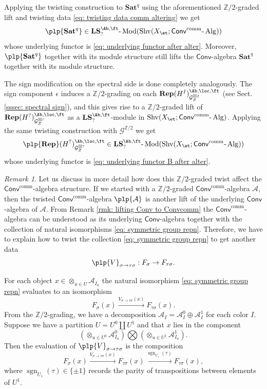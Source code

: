 \documentclass[10pt]{amsart}
\theoremstyle{remark}
\newtheorem{rmk}[subsubsection]{Remark}
\newcommand{\Z}{\mathbb{Z}}
\newcommand{\on}{\operatorname}
\newcommand{\cA}{\mathcal{A}}
\newcommand{\cG}{\mathcal{G}}
\newcommand{\lMod}{\text{-}\on{Mod}}
\newcommand{\lAlg}{\text{-}\on{Alg}}
\newcommand{\Shv}{\on{Shv}}
\newcommand{\Conv}{\mathsf{Conv}}
\newcommand{\Convcomm}{\mathsf{Conv}^{\on{comm}}}
\begin{document}
    Applying the twisting construction to $\mathbf{Sat}^q$ using the aforementioned $\Z/2$-graded lift and twisting data \eqref{eq: twisting data comm altering} we get 
    \[\plp{\mathbf{Sat}^q} \in\mathbf{LS}^{\Ab,\ft}_?\lMod(\Shv(X_{\et};\Convcomm\lAlg))\] whose underlying functor is \eqref{eq: underlying functor after alter}. Moreover, $\plp{\mathbf{Sat}^q}$ together with its module structure still lifts the $\Conv$-algebra $\mathbf{Sat}^q$ together with its module structure.
\medskip

    The sign modification on the spectral side is done completely analogously. The sign component $\epsilon$ induces a $\Z/2$-grading on each $\textbf{Rep}(H^I)^{\Ab,\loc,\ft}_{\cG^{\boxtimes I}_Z}$ (see Sect. \ref{sssec: spectral sign}), and this gives rise to a $\Z/2$-graded lift of $\textbf{Rep}(H^?)^{\Ab,\loc,\ft}_{\cG^{\boxtimes ?}_Z}$ as a $\mathbf{LS}^{\Ab,\ft}_?$-module in $\Shv(X_{\et};\Convcomm\lAlg)$. Applying the same twisting construction with $\cG^{\Z/2}$ we get
    \[\plp{\textbf{Rep}}(H^?)^{\Ab,\loc,\ft}_{\cG^{\boxtimes ?}_Z} \in \mathbf{LS}^{\Ab,\ft}_?\lMod(\Shv(X_{\et};\Convcomm\lAlg))\]
    whose underlying functor is \eqref{eq: underlying functor B after alter}.

    \begin{rmk}\label{rmk: twist by sign}
        Let us discuss in more detail how does this $\Z/2$-graded twist affect the $\Convcomm$-algebra structure. If we started with a $\Z/2$-graded $\Convcomm$-algebra $\cA$, then the twisted $\Convcomm$-algebra $\plp{\cA}$ is another lift of the underlying $\Conv$-algebra of $\cA$. From Remark \ref{rmk: lifting Conv to Convcomm} the $\Convcomm$-algebra can be understood as its underlying $\Conv$-algebra together with the collection of natural isomorphisms \eqref{eq: symmetric group repn}. Therefore, we have to explain how to twist the collection \eqref{eq: symmetric group repn} to get another data
        \[\plp{V}_{\sigma\rightarrow\tau\sigma}:F_{\sigma}\rightarrow F_{\tau\sigma}.\]
        
        For each object
        $x\in \otimes_{u\in U}\cA_{I_u}$ the natural isomorphism \eqref{eq: symmetric group repn} evaluates to an isomorphism \[F_{\sigma}(x)\xrightarrow{V_{\sigma\rightarrow\tau\sigma}(x)} F_{\tau\sigma}(x).\]
        From the $\Z/2$-grading, we have a decomposition $\cA_I=\cA^0_I\oplus \cA^1_I$ for each color $I$. Suppose we have a partition $U=U^0\coprod U^1$ and that $x$ lies in the component \[(\otimes_{u\in U^0}\cA^0_{I_u})\bigotimes (\otimes_{u\in U^1}\cA^1_{I_u}).\] Then the evaluation of $\plp{V}_{\sigma\rightarrow\tau\sigma}$ is the composition
        \[F_{\sigma}(x)\xrightarrow{V_{\sigma\rightarrow\tau\sigma}(x)} F_{\tau\sigma}(x)\xrightarrow{\on{sgn}_{U_1}(\tau)} F_{\tau\sigma}(x),\]
        where $\on{sgn}_{U_1}(\tau)\in \{\pm 1\}$ records the parity of transpositions between elements of $U^1$.
    \end{rmk}
    
\end{document}
